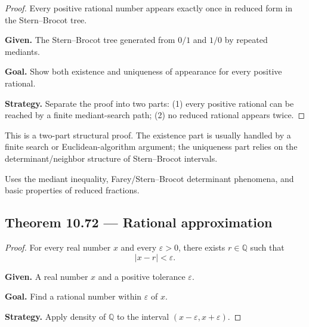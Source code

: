 \begin{proof}
\Claim Every positive rational number appears exactly once in reduced form in the Stern--Brocot tree.

\textbf{Given.} The Stern--Brocot tree generated from $0/1$ and $1/0$ by repeated mediants.

\textbf{Goal.} Show both existence and uniqueness of appearance for every positive rational.

\textbf{Strategy.} Separate the proof into two parts: (1) every positive rational can be reached by a finite mediant-search path; (2) no reduced rational appears twice.


\end{proof}

\begin{remark*}
This is a two-part structural proof.  The existence part is usually handled by a
finite search or Euclidean-algorithm argument; the uniqueness part relies on the
determinant/neighbor structure of Stern--Brocot intervals.
\end{remark*}

\begin{remark*}[Dependencies]
Uses the mediant inequality, Farey/Stern--Brocot determinant phenomena, and
basic properties of reduced fractions.
\end{remark*}


\subsection*{Theorem 10.72 — Rational approximation}
\label{prf:grep-rational-approximation}

\begin{proof}
\Claim For every real number $x$ and every $\varepsilon>0$, there exists $r \in \mathbb{Q}$ such that
\[
|x-r| < \varepsilon.
\]

\textbf{Given.} A real number $x$ and a positive tolerance $\varepsilon$.

\textbf{Goal.} Find a rational number within $\varepsilon$ of $x$.

\textbf{Strategy.} Apply density of $\mathbb{Q}$ to the interval $(x-\varepsilon, x+\varepsilon)$.


\end{proof}

